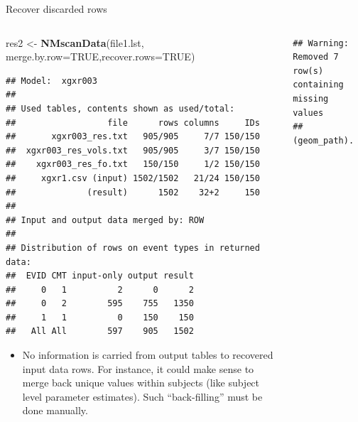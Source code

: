 \documentclass[
  8pt,
  ignorenonframetext,
  aspectratio=169]{beamer}
\newenvironment{Shaded}{\begin{snugshade}}{\end{snugshade}}
\newcommand{\DataTypeTok}[1]{\textcolor[rgb]{0.13,0.29,0.53}{#1}}
\newcommand{\KeywordTok}[1]{\textcolor[rgb]{0.13,0.29,0.53}{\textbf{#1}}}
\newcommand{\NormalTok}[1]{#1}
\newcommand{\OtherTok}[1]{\textcolor[rgb]{0.56,0.35,0.01}{#1}}
\newcommand{\StringTok}[1]{\textcolor[rgb]{0.31,0.60,0.02}{#1}}
\providecommand{\tightlist}{%
  \setlength{\itemsep}{0pt}\setlength{\parskip}{0pt}}
\begin{document}
\begin{frame}[fragile]{Recover discarded rows}
\protect\hypertarget{recover-discarded-rows}{}
\begin{columns}[T]
\begin{column}{0.45\textwidth}
\footnotesize

\begin{Shaded}
\begin{Highlighting}[]
\NormalTok{res2 \textless{}{-}}\StringTok{ }\KeywordTok{NMscanData}\NormalTok{(file1.lst,}
                   \DataTypeTok{merge.by.row=}\OtherTok{TRUE}\NormalTok{,}\DataTypeTok{recover.rows=}\OtherTok{TRUE}\NormalTok{)}
\end{Highlighting}
\end{Shaded}

\begin{verbatim}
## Model:  xgxr003 
## 
## Used tables, contents shown as used/total:
##                  file      rows columns     IDs
##       xgxr003_res.txt   905/905     7/7 150/150
##  xgxr003_res_vols.txt   905/905     3/7 150/150
##    xgxr003_res_fo.txt   150/150     1/2 150/150
##     xgxr1.csv (input) 1502/1502   21/24 150/150
##              (result)      1502    32+2     150
## 
## Input and output data merged by: ROW 
## 
## Distribution of rows on event types in returned data:
##  EVID CMT input-only output result
##     0   1          2      0      2
##     0   2        595    755   1350
##     1   1          0    150    150
##   All All        597    905   1502
\end{verbatim}

\begin{itemize}
\tightlist
\item
  No information is carried from output tables to recovered input data
  rows. For instance, it could make sense to merge back unique values
  within subjects (like subject level parameter estimates). Such
  ``back-filling'' must be done manually.
\end{itemize}
\end{column}

\begin{column}{0.55\textwidth}
\begin{verbatim}
## Warning: Removed 7 row(s) containing missing values
## (geom_path).
\end{verbatim}


\end{column}
\end{columns}
\end{frame}
\end{document}
